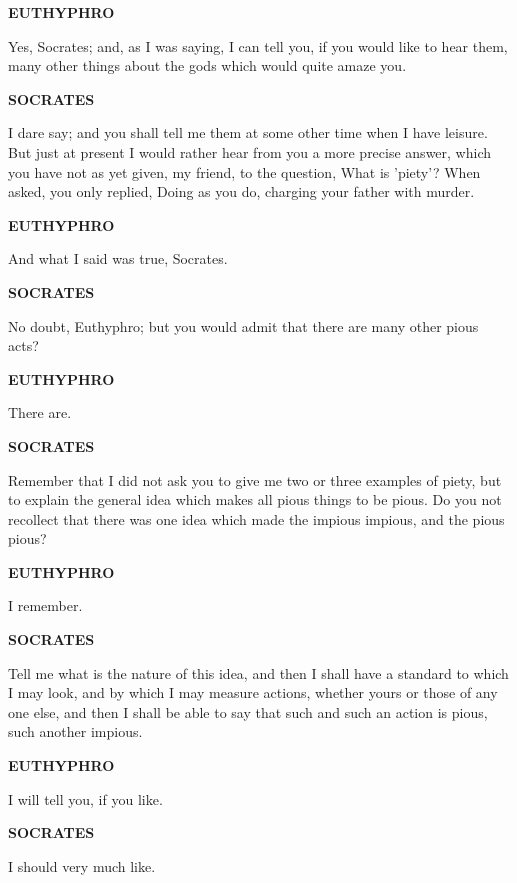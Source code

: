\documentclass[11pt,letter]{article}
\begin{document}
\par \textbf{EUTHYPHRO}
\par   Yes, Socrates; and, as I was saying, I can tell you, if you would like to hear them, many other things about the gods which would quite amaze you.

\par \textbf{SOCRATES}
\par   I dare say; and you shall tell me them at some other time when I have leisure. But just at present I would rather hear from you a more precise answer, which you have not as yet given, my friend, to the question, What is 'piety'? When asked, you only replied, Doing as you do, charging your father with murder.

\par \textbf{EUTHYPHRO}
\par   And what I said was true, Socrates.

\par \textbf{SOCRATES}
\par   No doubt, Euthyphro; but you would admit that there are many other pious acts?

\par \textbf{EUTHYPHRO}
\par   There are.

\par \textbf{SOCRATES}
\par   Remember that I did not ask you to give me two or three examples of piety, but to explain the general idea which makes all pious things to be pious. Do you not recollect that there was one idea which made the impious impious, and the pious pious?

\par \textbf{EUTHYPHRO}
\par   I remember.

\par \textbf{SOCRATES}
\par   Tell me what is the nature of this idea, and then I shall have a standard to which I may look, and by which I may measure actions, whether yours or those of any one else, and then I shall be able to say that such and such an action is pious, such another impious.

\par \textbf{EUTHYPHRO}
\par   I will tell you, if you like.

\par \textbf{SOCRATES}
\par   I should very much like.
\end{document}
